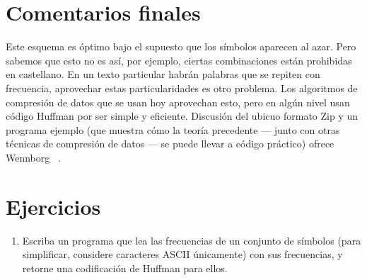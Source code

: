 
\section{Comentarios finales}
\label{sec:Huffman-comments}

  Este esquema es óptimo bajo el supuesto que los símbolos aparecen al azar.
  Pero sabemos que esto no es así,
  por ejemplo,
  ciertas combinaciones están prohibidas en castellano.
  En un texto particular habrán palabras que se repiten con frecuencia,
  aprovechar estas particularidades es otro problema.
  Los algoritmos de compresión de datos que se usan hoy aprovechan esto,
  pero en algún nivel usan código Huffman por ser simple y eficiente.
  Discusión del ubicuo formato Zip
  y un programa ejemplo
  (que muestra cómo la teoría precedente
   --- junto con otras técnicas de compresión de datos ---
   se puede llevar a código práctico)
  ofrece Wennborg~%
    \cite{wennborg20:_zip_files}.

    

\section*{Ejercicios}
\label{sec:ejercicios-09}

  \begin{enumerate}
  \item
    Escriba un programa que lea las frecuencias de un conjunto de símbolos
    (para simplificar,
     considere caracteres ASCII únicamente)
    con sus frecuencias,
    y retorne una codificación de Huffman para ellos.
  \end{enumerate}




